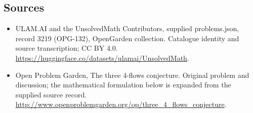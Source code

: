 \documentclass[11pt,a4paper]{article}
\begin{document}
\subsection{Sources}
\begin{itemize}
\item[S1] ULAM.AI and the UnsolvedMath Contributors, supplied problems.json, record 3219 (OPG-132), OpenGarden collection. Catalogue identity and source transcription; CC BY 4.0.
\url{https://huggingface.co/datasets/ulamai/UnsolvedMath}.
\item[S2] Open Problem Garden, The three 4-flows conjecture. Original problem and discussion; the mathematical formulation below is expanded from the supplied source record.
\url{http://www.openproblemgarden.org/op/three_4_flows_conjecture}.

\end{itemize}
\end{document}
